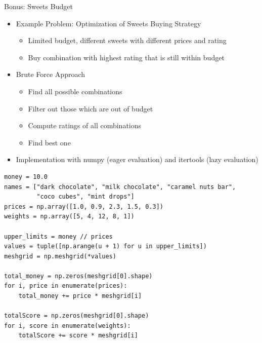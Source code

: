 \begin{frame}{Bonus: Sweets Budget}
%
\begin{itemize}
\item Example Problem: Optimization of Sweets Buying Strategy
	\begin{itemize}
	\item Limited budget, different sweets with different prices and rating
	\item[\Thus] Buy combination with highest rating that is still within budget
	\end{itemize}
\item Brute Force Approach
	\begin{itemize}
	\item Find all possible combinations
	\item Filter out those which are out of budget
	\item Compute ratings of all combinations
	\item Find best one
	\end{itemize}
\item Implementation with numpy (eager evaluation) and itertools (lazy evaluation)
\end{itemize}
%
\end{frame}


\begin{frame}[fragile]
%
\begin{codebox}
\begin{verbatim}
money = 10.0
names = ["dark chocolate", "milk chocolate", "caramel nuts bar", 
         "coco cubes", "mint drops"]
prices = np.array([1.0, 0.9, 2.3, 1.5, 0.3])
weights = np.array([5, 4, 12, 8, 1])

upper_limits = money // prices
values = tuple([np.arange(u + 1) for u in upper_limits])
meshgrid = np.meshgrid(*values)

total_money = np.zeros(meshgrid[0].shape)
for i, price in enumerate(prices):
    total_money += price * meshgrid[i]

totalScore = np.zeros(meshgrid[0].shape)
for i, score in enumerate(weights):
    totalScore += score * meshgrid[i]
\end{verbatim}
\end{codebox}
%
\end{frame}


